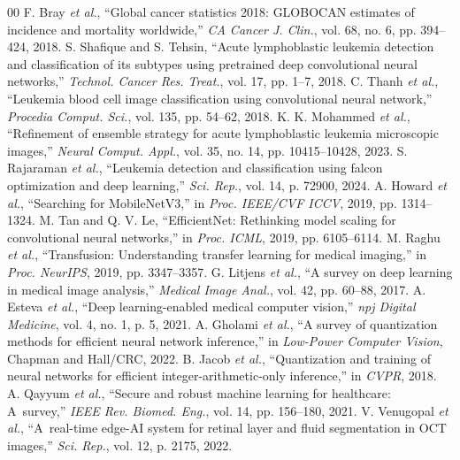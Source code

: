 \documentclass[journal,twoside,web]{ieeecolor}
\begin{document}
\providecommand{\refname}{References}
\begin{thebibliography}{00}
 F. Bray \textit{et al.}, ``Global cancer statistics 2018: GLOBOCAN estimates of incidence and mortality worldwide,'' \textit{CA Cancer J. Clin.}, vol. 68, no. 6, pp. 394--424, 2018.
 S. Shafique and S. Tehsin, ``Acute lymphoblastic leukemia detection and classification of its subtypes using pretrained deep convolutional neural networks,'' \textit{Technol. Cancer Res. Treat.}, vol. 17, pp. 1--7, 2018.
 C. Thanh \textit{et al.}, ``Leukemia blood cell image classification using convolutional neural network,'' \textit{Procedia Comput. Sci.}, vol. 135, pp. 54--62, 2018.
 K. K. Mohammed \textit{et al.}, ``Refinement of ensemble strategy for acute lymphoblastic leukemia microscopic images,'' \textit{Neural Comput. Appl.}, vol. 35, no. 14, pp. 10415--10428, 2023.
 S. Rajaraman \textit{et al.}, ``Leukemia detection and classification using falcon optimization and deep learning,'' \textit{Sci. Rep.}, vol. 14, p. 72900, 2024.
 A. Howard \textit{et al.}, ``Searching for MobileNetV3,'' in \textit{Proc. IEEE/CVF ICCV}, 2019, pp. 1314--1324.
 M. Tan and Q. V. Le, ``EfficientNet: Rethinking model scaling for convolutional neural networks,'' in \textit{Proc. ICML}, 2019, pp. 6105--6114.
 M. Raghu \textit{et al.}, ``Transfusion: Understanding transfer learning for medical imaging,'' in \textit{Proc. NeurIPS}, 2019, pp. 3347--3357.
 G. Litjens \textit{et al.}, ``A survey on deep learning in medical image analysis,'' \textit{Medical Image Anal.}, vol. 42, pp. 60--88, 2017.
 A. Esteva \textit{et al.}, ``Deep learning-enabled medical computer vision,'' \textit{npj Digital Medicine}, vol. 4, no. 1, p. 5, 2021.
 A. Gholami \textit{et al.}, ``A survey of quantization methods for efficient neural network inference,'' in \textit{Low-Power Computer Vision}, Chapman and Hall/CRC, 2022.
 B. Jacob \textit{et al.}, ``Quantization and training of neural networks for efficient integer-arithmetic-only inference,'' in \textit{CVPR}, 2018.
 A. Qayyum \textit{et al.}, ``Secure and robust machine learning for healthcare: A~survey,'' \textit{IEEE Rev. Biomed. Eng.}, vol. 14, pp. 156--180, 2021.
 V. Venugopal \textit{et al.}, ``A~real-time edge-AI system for retinal layer and fluid segmentation in OCT images,'' \textit{Sci. Rep.}, vol. 12, p. 2175, 2022.

\end{thebibliography}
\end{document}
